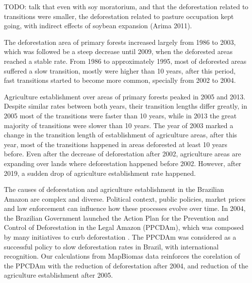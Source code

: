 \documentclass[essd, manuscript]{copernicus}
\begin{document}
TODO: talk that even with soy moratorium, and that the deforestation related to transitions were smaller, the deforestation related to pasture occupation kept going, with indirect effects of soybean expansion (Arima 2011).

The deforestation area of primary forests increased largely from 1986 to 2003, which was followed be a steep decrease until 2009, when the deforested areas reached a stable rate.
From 1986 to approximately 1995, most of deforested areas suffered a slow transition, mostly were higher than 10 years, after this period, fast transitions started to become more common, specially from 2002 to 2004.

Agriculture establishment over areas of primary forests peaked in 2005 and 2013.
Despite similar rates between both years, their transition lengths differ greatly, in 2005 most of the transitions were faster than 10 years, while in 2013 the great majority of transitions were slower than 10 years.
The year of 2003 marked a change in the transition length of establishment of agriculture areas, after this year, most of the transitions happened in areas deforested at least 10 years before.
Even after the decrease of deforestation after 2002, agriculture areas are expanding over lands where deforestation happened before 2002.
However, after 2019, a sudden drop of agriculture establishment rate happened.

The causes of deforestation and agriculture establishment in the Brazilian Amazon are complex and diverse.
Political context, public policies, market prices and law enforcement can influence how these processes evolve over time.
In 2004, the Brazilian Government launched the Action Plan for the Prevention and Control of Deforestation in the Legal Amazon (PPCDAm), which was composed by many initiatives to curb deforestation \citep{West2021}.
The PPCDAm was considered as a successful policy to slow deforestation rates in Brazil, with international recognition.
Our calculations from MapBiomas data reinforces the corelation of the PPCDAm with the reduction of deforestation after 2004, and reduction of the agriculture establishment after 2005.
\end{document}

